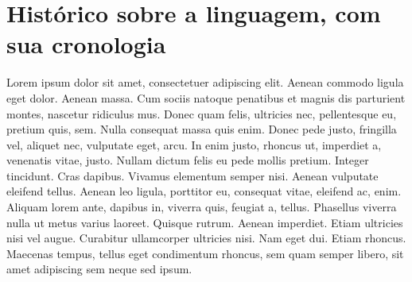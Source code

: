 \chapter{Histórico sobre a linguagem, com sua cronologia}

    Lorem ipsum dolor sit amet, consectetuer adipiscing 
    elit. Aenean commodo ligula eget dolor. Aenean massa.
    Cum sociis natoque penatibus et magnis dis parturient
    montes, nascetur ridiculus mus. Donec quam felis, 
    ultricies nec, pellentesque eu, pretium quis, sem. 
    Nulla consequat massa quis enim. Donec pede justo, 
    fringilla vel, aliquet nec, vulputate eget, arcu. In 
    enim justo, rhoncus ut, imperdiet a, venenatis vitae,
    justo. Nullam dictum felis eu pede mollis pretium. 
    Integer tincidunt. Cras dapibus. Vivamus elementum 
    semper nisi. Aenean vulputate eleifend tellus. Aenean 
    leo ligula, porttitor eu, consequat vitae, eleifend 
    ac, enim. Aliquam lorem ante, dapibus in, viverra 
    quis, feugiat a, tellus. Phasellus viverra nulla ut 
    metus varius laoreet. Quisque rutrum. Aenean imperdiet.
    Etiam ultricies nisi vel augue. Curabitur ullamcorper 
    ultricies nisi. Nam eget dui. Etiam rhoncus. Maecenas 
    tempus, tellus eget condimentum rhoncus, sem quam 
    semper libero, sit amet adipiscing sem neque sed ipsum.

    \nocite{haskellmicrosoft}
    \nocite{haskellreport2010}
    \nocite{haskelljobs}
    \nocite{haskellers}

    \newpage